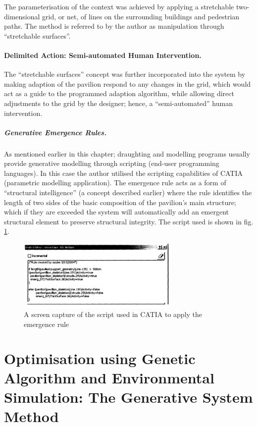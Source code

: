 The parameterisation of the context was achieved by applying a stretchable two-dimensional grid, or net, of lines on the surrounding buildings and pedestrian paths. The method is referred to by the author as manipulation through ``stretchable surfaces''.

\paragraph{Delimited Action: Semi-automated Human Intervention.}\mbox{}
The ``stretchable surfaces'' concept was further incorporated into the system by making adaption of the pavilion respond to any changes in the grid, which would act as a guide to the programmed adaption algorithm, while allowing direct adjustments to the grid by the designer; hence, a ``semi-automated'' human intervention.

\subparagraph{Generative Emergence Rules.} As mentioned earlier in this chapter; draughting and modelling programs usually provide generative modelling through scripting (end-user programming languages). In this case the author \cite{zulas04} utilised the scripting capabilities of CATIA (parametric modelling application). The emergence rule acts as a form of ``structural intelligence'' (a concept described earlier) where the rule identifies the length of two sides of the basic composition of the pavilion's main structure; which if they are exceeded the system will automatically add an emergent structural element to preserve structural integrity. The script used is shown in fig. \ref{fig:EmergRuleScr}.

\begin{figure}[htbp]
\centering
\includegraphics[width=0.7\textwidth]{./Images/14-EmergRuleScr}
\caption[Emergence Rule Script]{A screen capture of the script used in CATIA to apply the emergence rule \cite{zulas04}}
\label{fig:EmergRuleScr}
\end{figure}

\clearpage
\section{Optimisation using Genetic Algorithm and Environmental Simulation: The Generative System Method}
\label{sec:GSM}


